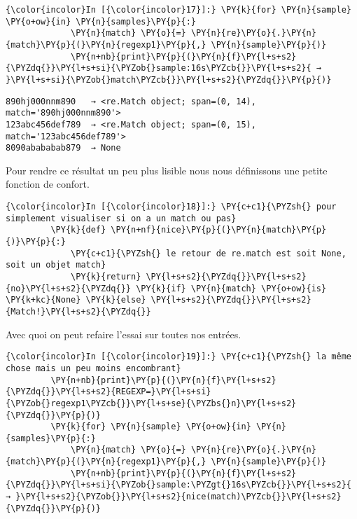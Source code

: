     \begin{Verbatim}[commandchars=\\\{\},frame=single,framerule=0.3mm,rulecolor=\color{cellframecolor}]
{\color{incolor}In [{\color{incolor}17}]:} \PY{k}{for} \PY{n}{sample} \PY{o+ow}{in} \PY{n}{samples}\PY{p}{:}
             \PY{n}{match} \PY{o}{=} \PY{n}{re}\PY{o}{.}\PY{n}{match}\PY{p}{(}\PY{n}{regexp1}\PY{p}{,} \PY{n}{sample}\PY{p}{)}
             \PY{n+nb}{print}\PY{p}{(}\PY{n}{f}\PY{l+s+s2}{\PYZdq{}}\PY{l+s+si}{\PYZob{}sample:16s\PYZcb{}}\PY{l+s+s2}{ → }\PY{l+s+si}{\PYZob{}match\PYZcb{}}\PY{l+s+s2}{\PYZdq{}}\PY{p}{)}
\end{Verbatim}


    \begin{Verbatim}[commandchars=\\\{\},frame=single,framerule=0.3mm,rulecolor=\color{cellframecolor}]
890hj000nnm890   → <re.Match object; span=(0, 14), match='890hj000nnm890'>
123abc456def789  → <re.Match object; span=(0, 15), match='123abc456def789'>
8090abababab879  → None
\end{Verbatim}

    Pour rendre ce résultat un peu plus lisible nous nous définissons une
petite fonction de confort.

    \begin{Verbatim}[commandchars=\\\{\},frame=single,framerule=0.3mm,rulecolor=\color{cellframecolor}]
{\color{incolor}In [{\color{incolor}18}]:} \PY{c+c1}{\PYZsh{} pour simplement visualiser si on a un match ou pas}
         \PY{k}{def} \PY{n+nf}{nice}\PY{p}{(}\PY{n}{match}\PY{p}{)}\PY{p}{:}
             \PY{c+c1}{\PYZsh{} le retour de re.match est soit None, soit un objet match}
             \PY{k}{return} \PY{l+s+s2}{\PYZdq{}}\PY{l+s+s2}{no}\PY{l+s+s2}{\PYZdq{}} \PY{k}{if} \PY{n}{match} \PY{o+ow}{is} \PY{k+kc}{None} \PY{k}{else} \PY{l+s+s2}{\PYZdq{}}\PY{l+s+s2}{Match!}\PY{l+s+s2}{\PYZdq{}}
\end{Verbatim}


    Avec quoi on peut refaire l'essai sur toutes nos entrées.

    \begin{Verbatim}[commandchars=\\\{\},frame=single,framerule=0.3mm,rulecolor=\color{cellframecolor}]
{\color{incolor}In [{\color{incolor}19}]:} \PY{c+c1}{\PYZsh{} la même chose mais un peu moins encombrant}
         \PY{n+nb}{print}\PY{p}{(}\PY{n}{f}\PY{l+s+s2}{\PYZdq{}}\PY{l+s+s2}{REGEXP=}\PY{l+s+si}{\PYZob{}regexp1\PYZcb{}}\PY{l+s+se}{\PYZbs{}n}\PY{l+s+s2}{\PYZdq{}}\PY{p}{)}
         \PY{k}{for} \PY{n}{sample} \PY{o+ow}{in} \PY{n}{samples}\PY{p}{:}
             \PY{n}{match} \PY{o}{=} \PY{n}{re}\PY{o}{.}\PY{n}{match}\PY{p}{(}\PY{n}{regexp1}\PY{p}{,} \PY{n}{sample}\PY{p}{)}
             \PY{n+nb}{print}\PY{p}{(}\PY{n}{f}\PY{l+s+s2}{\PYZdq{}}\PY{l+s+si}{\PYZob{}sample:\PYZgt{}16s\PYZcb{}}\PY{l+s+s2}{ → }\PY{l+s+s2}{\PYZob{}}\PY{l+s+s2}{nice(match)\PYZcb{}}\PY{l+s+s2}{\PYZdq{}}\PY{p}{)}
\end{Verbatim}


